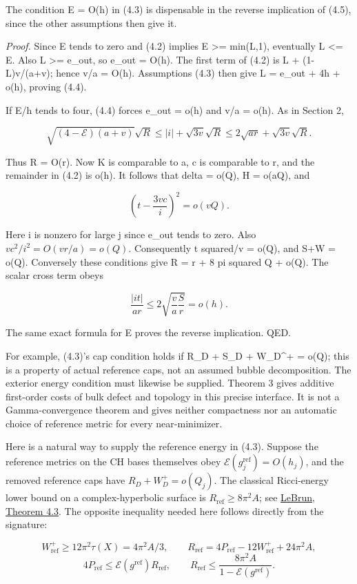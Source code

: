 \documentclass[
  10pt,
]{article}
\begin{document}
The condition E = O(h) in (4.3) is dispensable in the reverse
implication of (4.5), since the other assumptions then give it.

\emph{Proof.} Since E tends to zero and (4.2) implies E \textgreater=
min(L,1), eventually L \textless= E. Also L \textgreater= e\_out, so
e\_out = O(h). The first term of (4.2) is L + (1-L)v/(a+v); hence v/a =
O(h). Assumptions (4.3) then give L = e\_out + 4h + o(h), proving (4.4).

If E/h tends to four, (4.4) forces e\_out = o(h) and v/a = o(h). As in
Section 2,

\[
 \sqrt{(4-\mathcal E)(a+v)}\sqrt R
                 \le |i|+\sqrt{3v}\sqrt R
                 \le2\sqrt{ar}+\sqrt{3v}\sqrt R.
\]

Thus R = O(r). Now K is comparable to a, c is comparable to r, and the
remainder in (4.2) is o(h). It follows that delta = o(Q), H = o(aQ), and

\[
 \left(t-\frac{3vc}{i}\right)^2=o(vQ).
\]

Here i is nonzero for large j since e\_out tends to zero. Also
\(v c^2/i^2=O(vr/a)=o(Q)\). Consequently t squared/v = o(Q), and S+W =
o(Q). Conversely these conditions give R = r + 8 pi squared Q + o(Q).
The scalar cross term obeys

\[
 \frac{|it|}{ar}\le
             2\sqrt{\frac{v}{a}\frac{S}{r}}=o(h).
\]

The same exact formula for E proves the reverse implication. QED.

For example, (4.3)'s cap condition holds if R\_D + S\_D + W\_D\^{}+ =
o(Q); this is a property of actual reference caps, not an assumed bubble
decomposition. The exterior energy condition must likewise be supplied.
Theorem 3 gives additive first-order costs of bulk defect and topology
in this precise interface. It is not a Gamma-convergence theorem and
gives neither compactness nor an automatic choice of reference metric
for every near-minimizer.

Here is a natural way to supply the reference energy in (4.3). Suppose
the reference metrics on the CH bases themselves obey
\(\mathcal E(g_j^{\mathrm{ref}})=O(h_j)\), and the removed reference
caps have \(R_D+W_D^+=o(Q_j)\). The classical Ricci-energy lower bound
on a complex-hyperbolic surface is \(R_{\mathrm{ref}}\ge8\pi^2A\); see
\href{https://arxiv.org/html/math/0003068}{LeBrun, Theorem 4.3}. The
opposite inequality needed here follows directly from the signature:

\[
 W_{\mathrm{ref}}^+\ge12\pi^2\tau(X)=4\pi^2A/3,\qquad
 R_{\mathrm{ref}}=4P_{\mathrm{ref}}-12W_{\mathrm{ref}}^+
                                                    +24\pi^2A,
\] \[
 4P_{\mathrm{ref}}\le
       \mathcal E(g^{\mathrm{ref}})R_{\mathrm{ref}},
 \qquad
 R_{\mathrm{ref}}\le
       \frac{8\pi^2A}{1-\mathcal E(g^{\mathrm{ref}})}.    \tag{4.6}
\]
\end{document}
